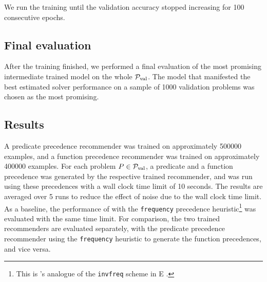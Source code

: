 We run the training until the validation accuracy stopped increasing for 100 consecutive epochs.

\subsection{Final evaluation}

After the training finished,
we performed a final evaluation of the most promising intermediate trained model on the whole $\operatorname{\mathcal{P}_{\mathrm{val}}}$.
The model that manifested the best estimated solver performance on a sample of \num{1000} validation problems
was chosen as the most promising.

\subsection{Results}

A predicate precedence recommender was trained on approximately \num{500000} examples,
and a function precedence recommender was trained on approximately \num{400000} examples.
For each problem $P \in \operatorname{\mathcal{P}_{\mathrm{val}}}$,
a predicate and a function precedence
was generated by the respective trained recommender,
and \Vampire{} was run using these precedences
with a wall clock time limit of 10 seconds.
The results are averaged over 5 runs to reduce the effect of noise due to the wall clock time limit.
As a baseline, the performance of \Vampire{} with the \texttt{frequency} precedence heuristic\footnote{
This is \Vampire{}'s analogue of the \texttt{invfreq} scheme in E \cite{E-manual}.}
was evaluated with the same time limit.
For comparison, the two trained recommenders are evaluated separately,
with the predicate precedence recommender using the \texttt{frequency} heuristic to generate the function precedences, and vice versa.

